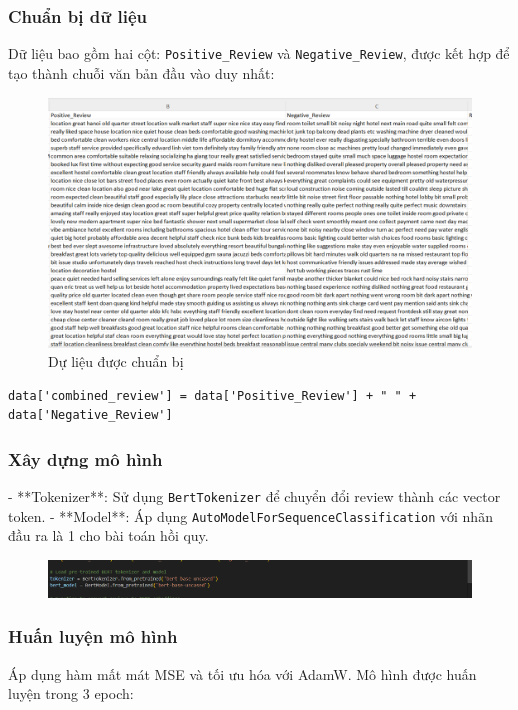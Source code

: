 \subsubsection{Chuẩn bị dữ liệu}
Dữ liệu bao gồm hai cột: \texttt{Positive\_Review} và \texttt{Negative\_Review}, được kết hợp để tạo thành chuỗi văn bản đầu vào duy nhất:
\begin{figure}[H]
        \centering
        \includegraphics[width=1\linewidth]{Figures/9.1.png}
        \caption{Dự liệu được chuẩn bị}
        \label{fig:enter-label}
    \end{figure}
\begin{verbatim}
data['combined_review'] = data['Positive_Review'] + " " + data['Negative_Review']
\end{verbatim}

\subsubsection{Xây dựng mô hình}
- **Tokenizer**: Sử dụng \texttt{BertTokenizer} để chuyển đổi review thành các vector token.
- **Model**: Áp dụng \texttt{AutoModelForSequenceClassification} với nhãn đầu ra là 1 cho bài toán hồi quy.


\begin{figure}[H]
        \centering
        \includegraphics[width=1\linewidth]{Figures/9.2.png}
        \label{fig:enter-label}
    \end{figure}

\subsubsection{Huấn luyện mô hình}
Áp dụng hàm mất mát MSE và tối ưu hóa với AdamW. Mô hình được huấn luyện trong 3 epoch:

